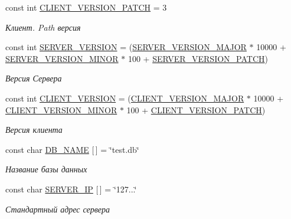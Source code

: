 \begin{DoxyCompactItemize}
const int \mbox{\hyperlink{namespace_b_r_a35ec7e796e49c1a6b87e73c07d643378}{C\+L\+I\+E\+N\+T\+\_\+\+V\+E\+R\+S\+I\+O\+N\+\_\+\+P\+A\+T\+CH}} = 3
\begin{DoxyCompactList}\small\item\em Клиент. Path версия \end{DoxyCompactList}\item 
const int \mbox{\hyperlink{namespace_b_r_adfde74493201d02cbbe52fc1d83bf1ec}{S\+E\+R\+V\+E\+R\+\_\+\+V\+E\+R\+S\+I\+ON}} = (\mbox{\hyperlink{namespace_b_r_a767d5d7fec5adfa1bf5a7c03f98beaaf}{S\+E\+R\+V\+E\+R\+\_\+\+V\+E\+R\+S\+I\+O\+N\+\_\+\+M\+A\+J\+OR}} $\ast$ 10000 + \mbox{\hyperlink{namespace_b_r_afb69faba1bc3b5d31b8514c0103b72a0}{S\+E\+R\+V\+E\+R\+\_\+\+V\+E\+R\+S\+I\+O\+N\+\_\+\+M\+I\+N\+OR}} $\ast$ 100 + \mbox{\hyperlink{namespace_b_r_ad496b6d1eb6371bb740df7c7fac12aba}{S\+E\+R\+V\+E\+R\+\_\+\+V\+E\+R\+S\+I\+O\+N\+\_\+\+P\+A\+T\+CH}})
\begin{DoxyCompactList}\small\item\em Версия Сервера \end{DoxyCompactList}\item 
const int \mbox{\hyperlink{namespace_b_r_a5efdcacd78568f72acf52924873804a3}{C\+L\+I\+E\+N\+T\+\_\+\+V\+E\+R\+S\+I\+ON}} = (\mbox{\hyperlink{namespace_b_r_a99a147d6069c07f03a2baf3bb531e308}{C\+L\+I\+E\+N\+T\+\_\+\+V\+E\+R\+S\+I\+O\+N\+\_\+\+M\+A\+J\+OR}} $\ast$ 10000 + \mbox{\hyperlink{namespace_b_r_a4182b988c7afdd13d1e00d1a558c44ab}{C\+L\+I\+E\+N\+T\+\_\+\+V\+E\+R\+S\+I\+O\+N\+\_\+\+M\+I\+N\+OR}} $\ast$ 100 + \mbox{\hyperlink{namespace_b_r_a35ec7e796e49c1a6b87e73c07d643378}{C\+L\+I\+E\+N\+T\+\_\+\+V\+E\+R\+S\+I\+O\+N\+\_\+\+P\+A\+T\+CH}})
\begin{DoxyCompactList}\small\item\em Версия клиента \end{DoxyCompactList}\item 
const char \mbox{\hyperlink{namespace_b_r_a30974fa6f1a17283bd60a3bb1e9501ff}{D\+B\+\_\+\+N\+A\+ME}} \mbox{[}$\,$\mbox{]} = \char`\"{}test.\+db\char`\"{}
\begin{DoxyCompactList}\small\item\em Название базы данных \end{DoxyCompactList}\item 
const char \mbox{\hyperlink{namespace_b_r_ae2055a331ff0a0d44ecdf49d643c143b}{S\+E\+R\+V\+E\+R\+\_\+\+IP}} \mbox{[}$\,$\mbox{]} = \char`\"{}127...\char`\"{}
\begin{DoxyCompactList}\small\item\em Стандартный адрес сервера \end{DoxyCompactList}\item 

\end{DoxyCompactItemize}
